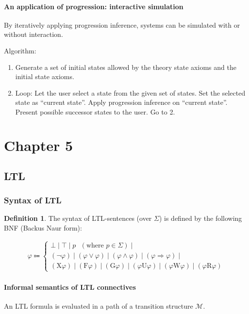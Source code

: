 \documentclass[10pt,a4paper]{article}
\theoremstyle{definition}
\newtheorem{definition}{Definition}[section]
\begin{document}
\paragraph{An application of progression: interactive simulation} By iteratively applying progression inference, systems can be simulated with or without interaction.

Algorithm: 
\begin{enumerate}
	\item Generate a set of initial states allowed by the theory state axioms and the initial state axioms. 
	\item Loop:
		Let the user select a state from the given set of states.
		Set the selected state as “current state”.
		Apply progression inference on “current state”.
		Present possible successor states to the user.
		Go to 2.

\end{enumerate}


\section{Chapter 5}

\subsection{LTL}
\subsubsection{Syntax of LTL}
\begin{definition}
The syntax of LTL-sentences (over $\Sigma$) is defined by the following BNF (Backus Naur form):

\begin{gather*}
\varphi \Coloneqq
\begin{cases}
	\bot \mid \top \mid p \text{ } (\text{where } p \in \Sigma) \mid \\
	(\lnot \varphi) \mid (\varphi \lor \varphi) \mid (\varphi \land \varphi) \mid (\varphi \Rightarrow \varphi) \mid \\
	(\text{X}\varphi) \mid (\text{F}\varphi) \mid (\text{G}\varphi) \mid (\varphi \text{U} \varphi) \mid (\varphi \text{W} \varphi) \mid (\varphi \text{R} \varphi)
\end{cases}
\end{gather*}
\end{definition}


\paragraph{Informal semantics of LTL connectives} An LTL formula is evaluated in a path of a transition structure $\mathcal{M}$.
\end{document}
